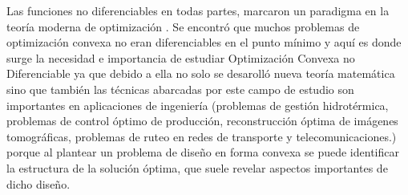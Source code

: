 Las funciones no diferenciables en todas partes, marcaron un paradigma en la teor\'ia moderna de optimizaci\'on \cite{intro}. Se encontr\'o 
que muchos problemas de optimizaci\'on convexa no eran diferenciables en el punto m\'inimo y aqu\'i es donde surge la necesidad e importancia
de estudiar Optimizaci\'on Convexa no Diferenciable ya que debido a ella no solo se desaroll\'o nueva teor\'ia matem\'atica sino que
tambi\'en las t\'ecnicas abarcadas por este campo de estudio son importantes en aplicaciones de ingenier\'ia (problemas de gesti\'on 
hidrot\'ermica, problemas de control \'optimo de producci\'on, reconstrucci\'on \'optima de im\'agenes tomogr\'aficas, problemas de ruteo
en redes de transporte y telecomunicaciones.) porque al plantear un problema de diseño en forma convexa se puede identificar la estructura de 
la solución \'optima, que suele revelar aspectos importantes de dicho diseño.



% 

